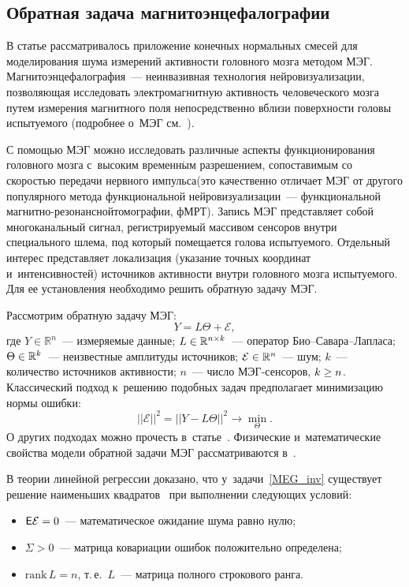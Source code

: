 \begin{multicols}{2}
\subsection{Обратная задача магнитоэнцефалографии}

В статье \cite{simple_mix} рассматривалось приложение конечных нормальных смесей для 
моделирования \mbox{шума} измерений активности головного мозга методом МЭГ. 
Магнитоэнцефалография~--- неинвазивная технология нейровизуализации, позволяющая исследовать 
электромагнитную активность человеческого мозга путем измерения магнитного поля непосредственно 
вблизи поверхности головы испытуемого (подробнее о~МЭГ см.~\cite{hama_main, our}).


С помощью МЭГ можно исследовать различные аспекты функционирования головного мозга 
с~высоким временн$\acute{\mbox{ы}}$м разрешением, сопоставимым со скоростью передачи 
нервного импульса\linebreak (это качественно отличает МЭГ от другого популярного метода функциональной 
нейровизуализации~--- функциональной маг\-нит\-но-ре\-зо\-нанс\-ной\linebreak томографии, фМРТ). 
Запись МЭГ представляет собой многоканальный сигнал, регистрируемый массивом сенсоров внут\-ри 
специального шлема, под который помещается голова испытуемого. Отдельный интерес представляет 
локализация (указание точных координат и~интенсивностей) источников активности 
внут\-ри головного мозга испытуемого. Для ее установления необходимо решить обратную задачу МЭГ.


Рассмотрим обратную задачу МЭГ:
\begin{equation}
\label{MEG_inv}
Y = L\Theta + \mathcal{E},
\end{equation}
где $Y \in \mathbb{R}^n$~--- измеряемые данные; $L\hm \in \mathbb{R}^{n \times k}$~--- оператор 
Био--Са\-ва\-ра--Лап\-ла\-са; $\Theta\hm \in \mathbb{R}^k$~--- 
неизвестные амплитуды источников; $\mathcal{E} \hm\in \mathbb{R}^n$~--- шум; $k$~--- 
количество источников активности; $n$~--- чис\-ло МЭГ-сен\-со\-ров, $k \hm\ge n$.
Классический подход к~решению подобных задач предполагает минимизацию нормы ошибки:
$$
||\mathcal{E}||^2 = ||Y - L\Theta||^2 \rightarrow \min\limits_\Theta.
$$
О других подходах можно прочесть в~статье~\cite{bayes_inverse}. 
Физические и~математические свойства модели обратной задачи МЭГ рассматриваются 
в~\cite{MEG_source_loc}.

В теории линейной регрессии доказано, что у~задачи~\eqref{MEG_inv} существует решение 
наименьших квадратов~\cite{app_regr} при выполнении следующих условий:
\begin{itemize}
    \item ${\sf E}\mathcal{E} = 0$~--- математическое ожидание шума равно нулю;
    \item $\Sigma > 0$~--- матрица ковариации ошибок положительно определена;
    \item $\mathrm{rank}\,L = n$, т.\,е.~$L$~--- мат\-ри\-ца полного строкового ранга.
\end{itemize}


\end{multicols}
